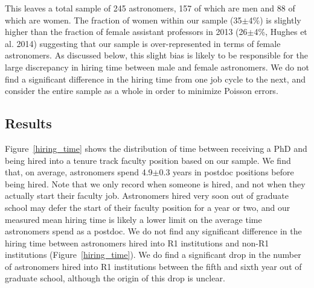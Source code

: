 \documentclass[modern]{aastex62}
\begin{document}
This leaves a total sample of 245 astronomers, 157 of which are men and 88 of which are women. The fraction of women within our sample (35$\pm$4\%) is slightly higher than the fraction of female assistant professors in 2013 (26$\pm$4\%, Hughes et al. 2014) suggesting that our sample is over-represented in terms of female astronomers. As discussed below, this slight bias is likely to be responsible for the large discrepancy in hiring time between male and female astronomers. We do not find a significant difference in the hiring time from one job cycle to the next, and consider the entire sample as a whole in order to minimize Poisson errors. 

\subsection{Results}
Figure~\ref{hiring_time} shows the distribution of time between receiving a PhD and being hired into a tenure track faculty position based on our sample. We find that, on average, astronomers spend 4.9$\pm$0.3 years in postdoc positions before being hired. Note that we only record when someone is hired, and not when they actually start their faculty job. Astronomers hired very soon out of graduate school may defer the start of their faculty position for a year or two, and our measured mean hiring time is likely a lower limit on the average time astronomers spend as a postdoc. We do not find any significant difference in the hiring time between astronomers hired into R1 institutions and non-R1 institutions (Figure~\ref{hiring_time}). We do find a significant drop in the number of astronomers hired into R1 institutions between the fifth and sixth year out of graduate school, although the origin of this drop is unclear. 
\end{document}
